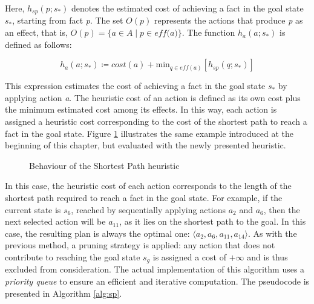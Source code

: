 Here, $h_{sp}\left(p;s_*\right)$ denotes the estimated cost of achieving a fact in the goal state $s_*$, starting from
fact \textit{p}. The set $O\left(p\right)$ represents the actions that produce \textit{p} as an effect,
that is, $O\left(p\right) = \{a \in A \mid p \in \textit{eff(a)}\}$. The function $h_a\left(a;s_*\right)$ is
defined as follows:

\begin{equation}
	\label{eq:spcost}
	h_a\left(a;s_*\right) \coloneqq cost(a) + \text{min}_{q \in \textit{eff}\left(a\right)} \left[h_{sp}\left(q;s_*\right)\right]
\end{equation}

This expression estimates the cost of achieving a fact in the goal state $s_*$ by applying
action \textit{a}. The heuristic cost of an action is defined as its own cost plus the minimum estimated cost among its effects.
In this way, each action is assigned a heuristic cost corresponding to the cost of the shortest path to reach
a fact in the goal state.
Figure \ref{fig:sp_scheme} illustrates the same example introduced at the beginning of this chapter, but evaluated with the newly presented heuristic.

\begin{figure}[ht]
	\centering
	\def\svgwidth{0.75\linewidth}
	
	\caption{Behaviour of the Shortest Path heuristic}
	\label{fig:sp_scheme}
\end{figure}

In this case, the heuristic cost of each action corresponds to the length of the shortest path required to reach a fact in the goal state.
For example, if the current state is $s_6$, reached by sequentially applying actions $a_2$ and $a_6$, then the next selected action will be $a_{11}$,
as it lies on the shortest path to the goal.
In this case, the resulting plan is always the optimal one: $\langle a_2, a_6, a_{11}, a_{14}\rangle$.
As with the previous method, a pruning strategy is applied: any action that does not contribute to reaching the goal state $s_g$ is
assigned a cost of $+\infty$ and is thus excluded from consideration.
The actual implementation of this algorithm uses a \textit{priority queue} to ensure an
efficient and iterative computation. The pseudocode is presented in Algorithm \ref{alg:sp}.

